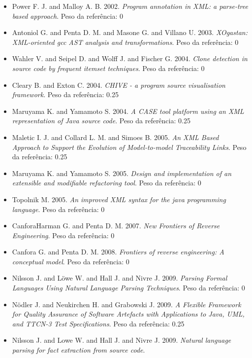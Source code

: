 \begin{itemize}
\item Power F. J. and Malloy A. B.
      2002.
      {\it Program annotation in XML: a parse-tree based approach}.
      Peso da referência: 0
\item Antoniol G. and Penta D. M. and Masone G. and Villano U.
      2003.
      {\it XOgastan: XML-oriented gcc AST analysis and transformations}.
      Peso da referência: 0
\item Wahler V. and Seipel D. and Wolff J. and Fischer G.
      2004.
      {\it Clone detection in source code by frequent itemset techniques}.
      Peso da referência: 0
\item Cleary B. and Exton C.
      2004.
      {\it CHIVE - a program source visualisation framework}.
      Peso da referência: 0.25
\item Maruyama K. and Yamamoto S.
      2004.
      {\it A CASE tool platform using an XML representation of Java source code}.
      Peso da referência: 0.25
\item Maletic I. J. and Collard L. M. and Simoes B.
      2005.
      {\it An XML Based Approach to Support the Evolution of Model-to-model Traceability Links}.
      Peso da referência: 0.25
\item Maruyama K. and Yamamoto S.
      2005.
      {\it Design and implementation of an extensible and modifiable refactoring tool}.
      Peso da referência: 0
\item Topolnik M.
      2005.
      {\it An improved XML syntax for the java programming language}.
      Peso da referência: 0
\item CanforaHarman G. and Penta D. M.
      2007.
      {\it New Frontiers of Reverse Engineering}.
      Peso da referência: 0
\item Canfora G. and Penta D. M.
      2008.
      {\it Frontiers of reverse engineering: A conceptual model}.
      Peso da referência: 0
\item Nilsson J. and L\"{o}we W. and Hall J. and Nivre J.
      2009.
      {\it Parsing Formal Languages Using Natural Language Parsing Techniques}.
      Peso da referência: 0
\item Nödler J. and Neukirchen H. and Grabowski J.
      2009.
      {\it A Flexible Framework for Quality Assurance of Software Artefacts with Applications to Java, UML, and TTCN-3 Test Specifications}.
      Peso da referência: 0.25
\item Nilsson J. and Lowe W. and Hall J. and Nivre J.
      2009.
      {\it Natural language parsing for fact extraction from source code}.

\end{itemize}
